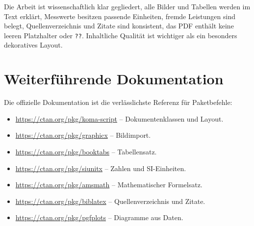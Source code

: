 \documentclass[11pt,a4paper,parskip=half]{scrartcl} %
\begin{document}
\begin{merkbox}[title={Vor der Abgabe abhaken}]
Die Arbeit ist wissenschaftlich klar gegliedert, alle Bilder und Tabellen werden
im Text erklärt, Messwerte besitzen passende Einheiten, fremde Leistungen sind
belegt, Quellenverzeichnis und Zitate sind konsistent, das PDF enthält keine
leeren Platzhalter oder \texttt{??}. Inhaltliche Qualität ist wichtiger als
ein besonders dekoratives Layout.
\end{merkbox}

\section{Weiterführende Dokumentation}
Die offizielle Dokumentation ist die verlässlichste Referenz für Paketbefehle:
\begin{itemize}
  \item \url{https://ctan.org/pkg/koma-script} – Dokumentenklassen und Layout.
  \item \url{https://ctan.org/pkg/graphicx} – Bildimport.
  \item \url{https://ctan.org/pkg/booktabs} – Tabellensatz.
  \item \url{https://ctan.org/pkg/siunitx} – Zahlen und SI-Einheiten.
  \item \url{https://ctan.org/pkg/amsmath} – Mathematischer Formelsatz.
  \item \url{https://ctan.org/pkg/biblatex} – Quellenverzeichnis und Zitate.
  \item \url{https://ctan.org/pkg/pgfplots} – Diagramme aus Daten.
\end{itemize}
\end{document}
